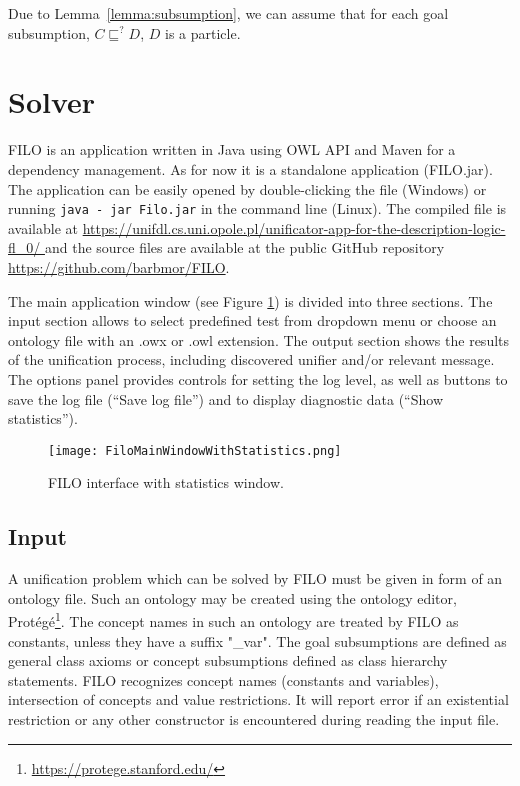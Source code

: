 \documentclass{article}
\begin{document}
	
Due to Lemma~\ref{lemma:subsumption}, we can assume that for each goal subsumption, $C \sqsubseteq^? D$, $D$ is a particle.
	
\section{Solver}	
	
FILO is an application written in Java using OWL API and Maven for a dependency management.
As for now it is a standalone application (FILO.jar). The application can be easily opened by double-clicking the file (Windows) or running \texttt{java - jar Filo.jar} in the command line (Linux).
 The compiled file is available at \href{https://unifdl.cs.uni.opole.pl/unificator-app-for-the-description-logic-fl_0}{\url{https://unifdl.cs.uni.opole.pl/unificator-app-for-the-description-logic-fl_0/ }}
  and the source files are available at the public GitHub repository \href{https://github.com/barbmor/FILO}{\url{https://github.com/barbmor/FILO}}.

The main application window (see Figure \ref{FILO:interface}) is divided into three sections. The input section allows to select predefined test from dropdown menu or choose an ontology file with an .owx or .owl extension. The output section shows the results of the unification process, including discovered unifier and/or relevant message. The options panel provides controls for setting the log level, as well as buttons to save the log file (“Save log file”) and to display diagnostic data (“Show statistics”).

\begin{figure}[H]
\centering
\texttt{[image: FiloMainWindowWithStatistics.png]}
\caption{FILO interface with statistics window.}
\label{FILO:interface}
\end{figure}

\subsection{Input}	
	

A unification problem which can be solved by FILO must be given in form of an ontology file. Such an ontology may be created  using the ontology editor, Prot\'eg\'e\footnote{\url{https://protege.stanford.edu/}}. The concept names in such an ontology are treated by FILO
as constants, unless they have a suffix "\_var". The goal subsumptions are defined as general class axioms or concept subsumptions defined as class hierarchy statements. FILO recognizes concept names (constants and variables),
intersection of concepts and value restrictions. It will report error if an existential restriction or
any other constructor is encountered during reading the input file.
\end{document}
